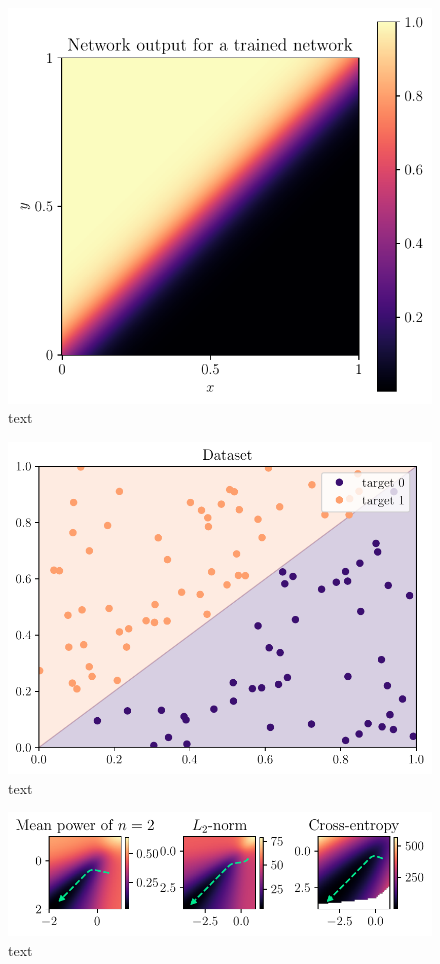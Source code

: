 \begin{figure}
	\centering
	\includegraphics{Experiment2/plots/Network_output.pdf}
	\caption{text}
\end{figure}

\begin{figure}
	\centering
	\includegraphics{Experiment2/plots/Dataset.pdf}
	\caption{text}
\end{figure}

\begin{figure}
	\centering
	\includegraphics{Experiment2/plots/LossSurfaces.pdf}
	\caption{text}
\end{figure}

